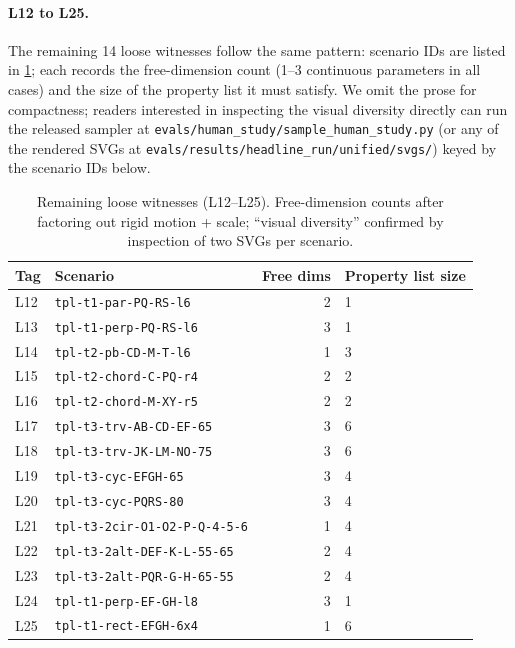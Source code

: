 \paragraph{L12 to L25.}
The remaining 14 loose witnesses follow the same pattern: scenario IDs are listed in \cref{tab:loose_witnesses_remaining}; each records the free-dimension count (1--3 continuous parameters in all cases) and the size of the property list it must satisfy.
We omit the prose for compactness; readers interested in inspecting the visual diversity directly can run the released sampler at \texttt{evals/human\_study/sample\_human\_study.py} (or any of the rendered SVGs at \texttt{evals/results/headline\_run/unified/svgs/}) keyed by the scenario IDs below.

\begin{table}[t]
\caption{Remaining loose witnesses (L12--L25). Free-dimension counts after factoring out rigid motion + scale; ``visual diversity'' confirmed by inspection of two SVGs per scenario.}
\label{tab:loose_witnesses_remaining}
\centering
\small
\begin{tabular}{llrl}
\toprule
\textbf{Tag} & \textbf{Scenario} & \textbf{Free dims} & \textbf{Property list size} \\
\midrule
L12 & \texttt{tpl-t1-par-PQ-RS-l6}        & 2 & 1 \\
L13 & \texttt{tpl-t1-perp-PQ-RS-l6}       & 3 & 1 \\
L14 & \texttt{tpl-t2-pb-CD-M-T-l6}        & 1 & 3 \\
L15 & \texttt{tpl-t2-chord-C-PQ-r4}       & 2 & 2 \\
L16 & \texttt{tpl-t2-chord-M-XY-r5}       & 2 & 2 \\
L17 & \texttt{tpl-t3-trv-AB-CD-EF-65}     & 3 & 6 \\
L18 & \texttt{tpl-t3-trv-JK-LM-NO-75}     & 3 & 6 \\
L19 & \texttt{tpl-t3-cyc-EFGH-65}         & 3 & 4 \\
L20 & \texttt{tpl-t3-cyc-PQRS-80}         & 3 & 4 \\
L21 & \texttt{tpl-t3-2cir-O1-O2-P-Q-4-5-6} & 1 & 4 \\
L22 & \texttt{tpl-t3-2alt-DEF-K-L-55-65}  & 2 & 4 \\
L23 & \texttt{tpl-t3-2alt-PQR-G-H-65-55}  & 2 & 4 \\
L24 & \texttt{tpl-t1-perp-EF-GH-l8}       & 3 & 1 \\
L25 & \texttt{tpl-t1-rect-EFGH-6x4}       & 1 & 6 \\
\bottomrule
\end{tabular}
\end{table}

